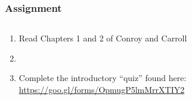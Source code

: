 \documentclass[color=usenames,dvipsnames]{beamer}
\begin{document}
\begin{frame}
  \frametitle{Assignment}
  \begin{columns}
    \begin{column}{0.6\textwidth}
      \large
      \begin{enumerate}[\bf 1.]
        \item<1-> Read Chapters 1 and 2 of Conroy and Carroll
        \item[]
        \item<1-> Complete the introductory ``quiz'' found here: \\
          \tiny \url{https://goo.gl/forms/OpmugP5lmMrrXTIY2}
      \end{enumerate}
    \end{column}
    \begin{column}{0.4\textwidth}
    \end{column}
  \end{columns}
\end{frame}
\end{document}
